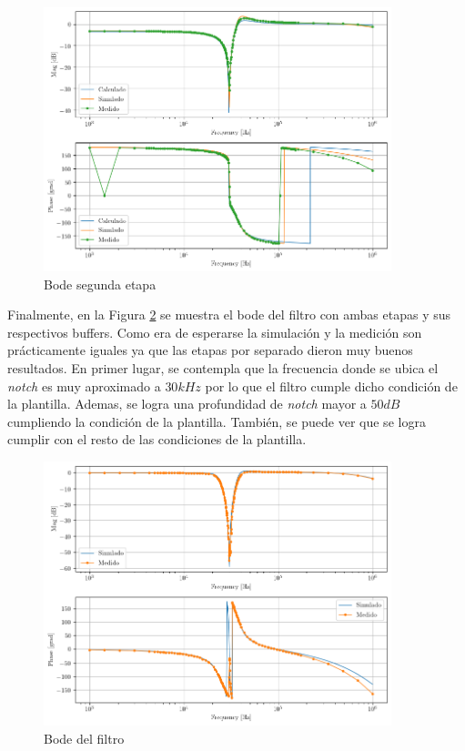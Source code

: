 \begin{figure}[h!]                                                
    \centering\includegraphics[width=0.9\textwidth]{../Ex4/Resources/ej4_bode_e2.png}
    \caption{Bode segunda etapa}
    \label{fig:ej4_bode_e2}
    \end{figure}

Finalmente, en la Figura \ref{fig:ej4_bode_completo} se muestra el bode del filtro con ambas etapas y sus respectivos buffers. Como era de esperarse la simulación y la medición son prácticamente iguales ya que las etapas por separado dieron muy buenos resultados. En primer lugar, se contempla que la frecuencia donde se ubica el \textit{notch} es muy aproximado a $30 kHz$ por lo que el filtro cumple dicho condición de la plantilla. Ademas, se logra una profundidad de \textit{notch} mayor a $50 dB$ cumpliendo la condición de la plantilla. También, se puede ver que se logra cumplir con el resto de las condiciones de la plantilla.   

\begin{figure}[h!]                                                
    \centering\includegraphics[width=0.9\textwidth]{../Ex4/Resources/ej4_bode.png}
    \caption{Bode del filtro}
    \label{fig:ej4_bode_completo}
    \end{figure}

